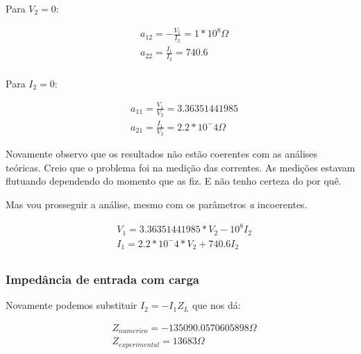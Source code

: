 \documentclass[12pt,twoside, a4paper, twocolumn]{article}
\begin{document}
Para $V_2 = 0$:


\begin{equation}
    \begin{aligned}
         & a_{12} = -\frac{V_1}{I_2} =  1 * 10^8 \varOmega \\
         & a_{22} = \frac{I_1}{I_2} = 740.6                \\
    \end{aligned}
\end{equation}


Para $I_2 = 0$:


\begin{equation}
    \begin{aligned}
         & a_{11} = \frac{V_1}{V_2} = 3.36351441985         \\
         & a_{21} = \frac{I_1}{V_2} = 2.2 * 10^-4 \varOmega
    \end{aligned}
\end{equation}


Novamente observo que os resultados não estão coerentes com as análises teóricas. Creio que o problema foi na medição das correntes. As medições estavam flutuando dependendo do momento que as fiz. E não tenho certeza do por quê.


Mas vou prosseguir a análise, mesmo com os parâmetros \emph{a} incoerentes.


\begin{equation}
    \begin{aligned}
         & V_1 = 3.36351441985 * V_2 -  10^8 I_2 \\
         & I_1 = 2.2 * 10^-4 *  V_2 + 740.6  I_2 \\
    \end{aligned}
\end{equation}


\subsubsection{Impedância de entrada com carga}


Novamente podemos substituir $I_2 = -I_1 Z_L$ que nos dá:


\begin{equation}
    \begin{aligned}
         & Z_{numerico} = -135090.0570605898 \varOmega \\
         & Z_{experimental} = 13683 \varOmega
    \end{aligned}
\end{equation}
\end{document}

